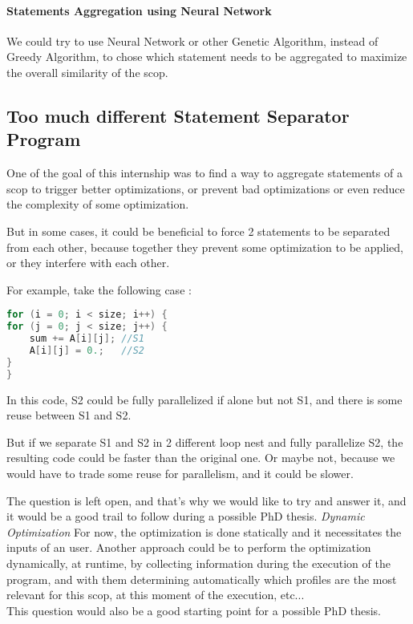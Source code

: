 \documentclass[paper=a4, fontsize=11pt]{scrartcl}
\numberwithin{equation}{section}        %
\numberwithin{figure}{section}          %
\numberwithin{table}{section}               %
\begin{document}
        \paragraph{Statements Aggregation using Neural Network}
            We could try to use Neural Network or other Genetic Algorithm, instead
            of Greedy Algorithm, to chose which statement needs to be aggregated to
            maximize the overall similarity of the scop.
    \subsection{Too much different Statement Separator Program}
        One of the goal of this internship was to find a way to aggregate statements
        of a scop to trigger better optimizations, or prevent bad optimizations or even
        reduce the complexity of some optimization.

        But in some cases, it could be beneficial to force 2 statements to be separated
        from each other, because together they prevent some optimization to be applied,
        or they interfere with each other.

        For example, take the following case :
\begin{lstlisting}[frame=single, language=C, caption={Statements Separation example}, label={lst:stmt_sep_example}]
for (i = 0; i < size; i++) {
for (j = 0; j < size; j++) {
    sum += A[i][j]; //S1
    A[i][j] = 0.;   //S2
}
}
\end{lstlisting}
        In this code, S2 could be fully parallelized if alone but not S1, and there is
        some reuse between S1 and S2.

        But if we separate S1 and S2 in 2 different loop nest and fully parallelize S2,
        the resulting code could be faster than the original one. Or maybe not, because
        we would have to trade some reuse for parallelism, and it could be slower.
        
        The question is left open, and that's why we would like to try and answer it, and it
        would be a good trail to follow during a possible PhD thesis.
    \textit{Dynamic Optimization}
        For now, the optimization is done statically and it necessitates the inputs of an
        user. Another approach could be to perform the optimization dynamically, at runtime,
        by collecting information during the execution of the program, and with them
        determining automatically which profiles are the most relevant for this scop, at
        this moment of the execution, etc...\\
        This question would also be a good starting point for a possible PhD thesis.

            
\printglossary



\end{document}
